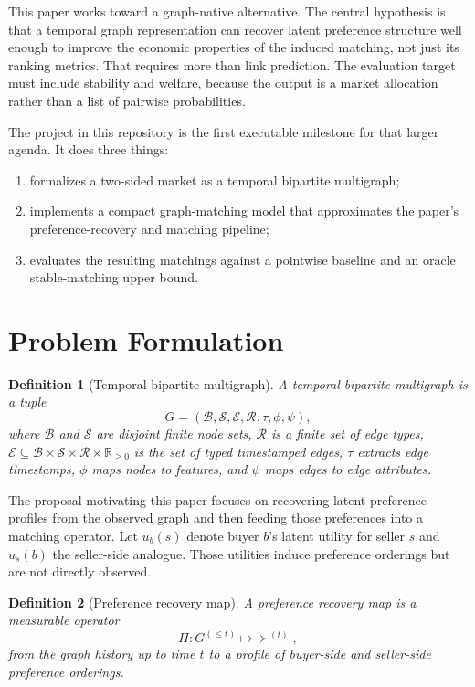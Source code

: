 \documentclass[11pt]{article}
\newtheorem{definition}{Definition}[section]
\newcommand{\buyers}{\mathcal{B}}
\newcommand{\sellers}{\mathcal{S}}
\newcommand{\edges}{\mathcal{E}}
\newcommand{\R}{\mathbb{R}}
\begin{document}
This paper works toward a graph-native alternative. The central hypothesis is
that a temporal graph representation can recover latent preference structure
well enough to improve the economic properties of the induced matching, not
just its ranking metrics. That requires more than link prediction. The
evaluation target must include stability and welfare, because the output is a
market allocation rather than a list of pairwise probabilities.

The project in this repository is the first executable milestone for that
larger agenda. It does three things:
\begin{enumerate}
  \item formalizes a two-sided market as a temporal bipartite multigraph;
  \item implements a compact graph-matching model that approximates the paper's
  preference-recovery and matching pipeline;
  \item evaluates the resulting matchings against a pointwise baseline and an
  oracle stable-matching upper bound.
\end{enumerate}

\section{Problem Formulation}

\begin{definition}[Temporal bipartite multigraph]
A temporal bipartite multigraph is a tuple
\[
G = (\buyers, \sellers, \edges, \mathcal{R}, \tau, \phi, \psi),
\]
where $\buyers$ and $\sellers$ are disjoint finite node sets, $\mathcal{R}$ is
a finite set of edge types, $\edges \subseteq \buyers \times \sellers \times
\mathcal{R} \times \R_{\ge 0}$ is the set of typed timestamped edges, $\tau$
extracts edge timestamps, $\phi$ maps nodes to features, and $\psi$ maps edges
to edge attributes.
\end{definition}

The proposal motivating this paper focuses on recovering latent preference
profiles from the observed graph and then feeding those preferences into a
matching operator. Let $u_b(s)$ denote buyer $b$'s latent utility for seller
$s$ and $u_s(b)$ the seller-side analogue. Those utilities induce preference
orderings but are not directly observed.

\begin{definition}[Preference recovery map]
A preference recovery map is a measurable operator
\[
\Pi : G^{(\le t)} \mapsto \succ^{(t)},
\]
from the graph history up to time $t$ to a profile of buyer-side and
seller-side preference orderings.
\end{definition}
\end{document}
